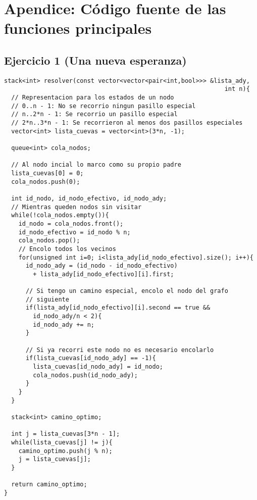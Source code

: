 \section{Apendice: Código fuente de las funciones principales}\label{sec:codigo}

\subsection{Ejercicio 1 (Una nueva esperanza)}
\begin{lstlisting}
stack<int> resolver(const vector<vector<pair<int,bool>>> &lista_ady,
                                                             int n){
  // Representacion para los estados de un nodo
  // 0..n - 1: No se recorrio ningun pasillo especial
  // n..2*n - 1: Se recorrio un pasillo especial
  // 2*n..3*n - 1: Se recorrieron al menos dos pasillos especiales
  vector<int> lista_cuevas = vector<int>(3*n, -1);

  queue<int> cola_nodos;

  // Al nodo incial lo marco como su propio padre
  lista_cuevas[0] = 0;
  cola_nodos.push(0);

  int id_nodo, id_nodo_efectivo, id_nodo_ady;
  // Mientras queden nodos sin visitar
  while(!cola_nodos.empty()){
    id_nodo = cola_nodos.front();
    id_nodo_efectivo = id_nodo % n;
    cola_nodos.pop();
    // Encolo todos los vecinos
    for(unsigned int i=0; i<lista_ady[id_nodo_efectivo].size(); i++){
      id_nodo_ady = (id_nodo - id_nodo_efectivo) 
        + lista_ady[id_nodo_efectivo][i].first;

      // Si tengo un camino especial, encolo el nodo del grafo 
      // siguiente
      if(lista_ady[id_nodo_efectivo][i].second == true && 
        id_nodo_ady/n < 2){
        id_nodo_ady += n;
      }

      // Si ya recorri este nodo no es necesario encolarlo
      if(lista_cuevas[id_nodo_ady] == -1){
        lista_cuevas[id_nodo_ady] = id_nodo;
        cola_nodos.push(id_nodo_ady);
      }
    }
  }

  stack<int> camino_optimo;

  int j = lista_cuevas[3*n - 1];
  while(lista_cuevas[j] != j){
    camino_optimo.push(j % n);
    j = lista_cuevas[j];
  }

  return camino_optimo;
}
\end{lstlisting}

